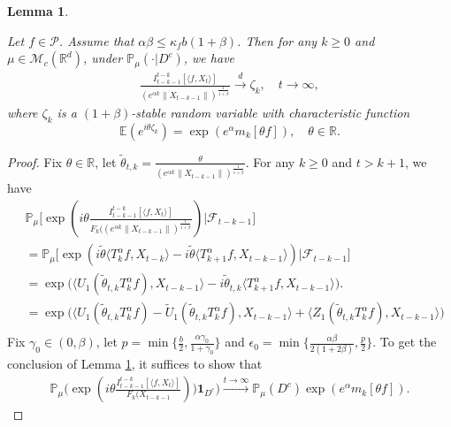 \documentclass[12pt,oneside,english]{amsart}
\theoremstyle{plain}
\newtheorem{lem}[thm]{Lemma}
\theoremstyle{definition}
\numberwithin{equation}{section}
\begin{document}
\begin{lem}\label{lem: mainlemma}

Let $f\in \mathcal{P}$.
Assume that $\alpha\beta\leq \kappa_fb(1+\beta)$.
Then for any $k\geq 0$ and $\mu \in \mathcal{M}_c(\mathbb{R}^d)$, under $\mathbb{P}_{\mu}(\cdot | D ^c)$, we have
 \begin{align}
      \frac{I_{t-k-1}^{t-k}[\langle f ,X_t\rangle]}{(e^{\alpha k}\|X_{t-k-1}\|)^{\frac{1}{1+\beta}}}\xrightarrow{d}\zeta_k, \quad t\rightarrow \infty, \label{limitdistribution1}
 \end{align}
 where $\zeta_k$ is a $(1+\beta)$-stable random variable with characteristic function
 $$\mathbb{E}(e^{i\theta\zeta_k})=\exp(e^{\alpha}m_k[\theta f]),\quad \theta \in \mathbb R.$$
 \end{lem}

 \begin{proof}
Fix $\theta \in \mathbb{R}$, let $\tilde{\theta}_{t,k}=\frac{\theta}{(e^{\alpha k}\|X_{t-k-1}\|)^{\frac{1}{1+\beta}}}$. For any $k\geq 0$ and $t>k+1$, we have
\begin{align}
    &\mathbb{P}_{\mu}\big[\exp(i\theta\frac {I_{t-k-1}^{t-k}[\langle f ,X_t\rangle]}{F_k((e^{\alpha k}\|X_{t-k-1}\|)^{\frac{1}{1+\beta}}})\big|\mathscr{F}_{t-k-1}\big]\\
    &=\mathbb{P}_{\mu}\big[\exp(i\tilde{\theta}\langle T_k^{\alpha}f,X_{t-k}\rangle-i\tilde{\theta}\langle T_{k+1}^{\alpha}f, X_{t-k-1}\rangle)\big|\mathscr{F}_{t-k-1}\big] \\
        &=\exp\big(\langle U_1(\tilde{\theta}_{t,k}T_k^{\alpha}f),X_{t-k-1}\rangle-i\tilde{\theta}_{t,k}\langle T_{k+1}^{\alpha}f, X_{t-k-1}\rangle\big).\\
        \label{condition mean}
        &=\exp\big(\langle U_1(\tilde{\theta}_{t,k}T_k^{\alpha}f)-\tilde{U}_1(\tilde{\theta}_{t,k}T_k^{\alpha}f),X_{t-k-1}\rangle+\langle Z_1(\tilde{\theta}_{t,k}T_k^{\alpha}f),X_{t-k-1}\rangle\big)\\
       \end{align}
         Fix $\gamma_0\in (0,\beta)$, let $p=\min\{\frac{b}{2},\frac{\alpha\gamma_0}{1+\gamma_0}\}$ and $\epsilon_0=\min\{\frac{\alpha\beta}{2(1+2\beta)},\frac{p}{2}\}$.
       To get the conclusion of Lemma \ref{lem: mainlemma}, it suffices to show that
       \begin{align}
           \mathbb{P}_{\mu}\Big(\exp(i\theta\frac{I_{t-k-1}^{t-k}[\langle f ,X_t\rangle]}{F_k(X_{t-k-1}}))\mathbf{1}_{D^c}\Big)\xrightarrow{t\rightarrow \infty}\mathbb{P}_{\mu}(D^c)\exp(e^{\alpha}m_k[\theta f]).
       \end{align}


\end{proof}
\end{document}
